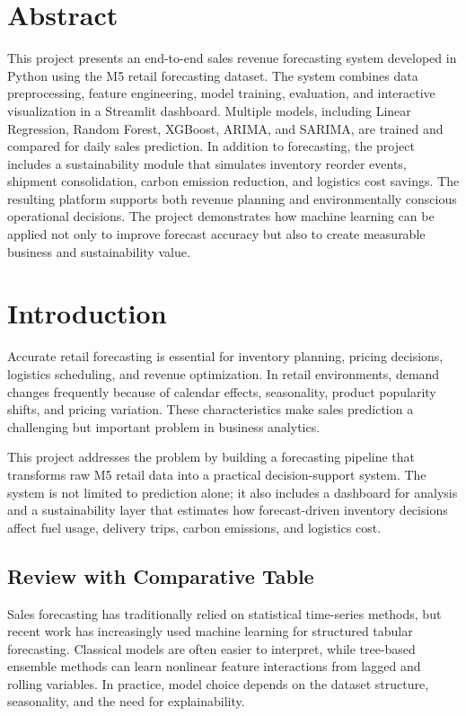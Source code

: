 \documentclass[12pt,a4paper]{article}
\begin{document}
\section*{Abstract}
This project presents an end-to-end sales revenue forecasting system developed in Python using the M5 retail forecasting dataset. The system combines data preprocessing, feature engineering, model training, evaluation, and interactive visualization in a Streamlit dashboard. Multiple models, including Linear Regression, Random Forest, XGBoost, ARIMA, and SARIMA, are trained and compared for daily sales prediction. In addition to forecasting, the project includes a sustainability module that simulates inventory reorder events, shipment consolidation, carbon emission reduction, and logistics cost savings. The resulting platform supports both revenue planning and environmentally conscious operational decisions. The project demonstrates how machine learning can be applied not only to improve forecast accuracy but also to create measurable business and sustainability value.
\newpage

\section{Introduction}
Accurate retail forecasting is essential for inventory planning, pricing decisions, logistics scheduling, and revenue optimization. In retail environments, demand changes frequently because of calendar effects, seasonality, product popularity shifts, and pricing variation. These characteristics make sales prediction a challenging but important problem in business analytics.

This project addresses the problem by building a forecasting pipeline that transforms raw M5 retail data into a practical decision-support system. The system is not limited to prediction alone; it also includes a dashboard for analysis and a sustainability layer that estimates how forecast-driven inventory decisions affect fuel usage, delivery trips, carbon emissions, and logistics cost.

\subsection{Review with Comparative Table}
Sales forecasting has traditionally relied on statistical time-series methods, but recent work has increasingly used machine learning for structured tabular forecasting. Classical models are often easier to interpret, while tree-based ensemble methods can learn nonlinear feature interactions from lagged and rolling variables. In practice, model choice depends on the dataset structure, seasonality, and the need for explainability.
\end{document}
